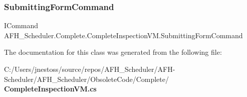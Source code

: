 \mbox{\label{class_a_f_h___scheduler_1_1_complete_1_1_complete_inspection_v_m_ae743f398581fd3ca0da85b6000de0e54}} 
\subsubsection{SubmittingFormCommand}
{\footnotesize\ttfamily I\+Command A\+F\+H\+\_\+\+Scheduler.\+Complete.\+Complete\+Inspection\+V\+M.\+Submitting\+Form\+Command\hspace{0.3cm}{\ttfamily [get]}}



The documentation for this class was generated from the following file\+:\begin{DoxyCompactItemize}
\item 
C\+:/\+Users/jnestoss/source/repos/\+A\+F\+H\+\_\+\+Scheduler/\+A\+F\+H-\/\+Scheduler/\+A\+F\+H\+\_\+\+Scheduler/\+Obsolete\+Code/\+Complete/\textbf{ Complete\+Inspection\+V\+M.\+cs}\end{DoxyCompactItemize}
